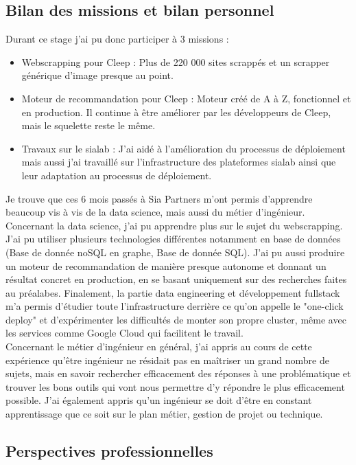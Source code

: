 \documentclass{article} %
\begin{document}
\subsection{Bilan des missions et bilan personnel}
Durant ce stage j'ai pu donc participer à 3 missions :
\begin{itemize}
	\item Webscrapping pour Cleep : Plus de 220 000 sites scrappés et un scrapper générique d'image presque au point.
	\item Moteur de recommandation pour Cleep : Moteur créé de A à Z, fonctionnel et en production. Il continue à être améliorer par les développeurs de Cleep, mais le squelette reste le même. 
	\item Travaux sur le sialab : J'ai aidé à l'amélioration du processus de déploiement mais aussi j'ai travaillé sur l'infrastructure des plateformes sialab ainsi que leur adaptation au processus de déploiement.
\end{itemize}

Je trouve que ces 6 mois passés à Sia Partners m'ont permis d'apprendre beaucoup vis à vis de la data science, mais aussi du métier d'ingénieur. Concernant la data science, j'ai pu apprendre plus sur le sujet du webscrapping. J'ai pu utiliser plusieurs technologies différentes notamment en base de données (Base de donnée noSQL en graphe, Base de donnée SQL). J'ai pu aussi produire un moteur de recommandation de manière presque autonome et donnant un résultat concret en production, en se basant uniquement sur des recherches faites au préalabes. Finalement, la partie data engineering et développement  fullstack m'a permis d'étudier toute l'infrastructure derrière ce qu'on appelle le "one-click deploy" et d'expérimenter les difficultés de monter son propre cluster, même avec les services comme Google Cloud qui facilitent le travail.\\

Concernant le métier d’ingénieur en général, j’ai appris au cours de cette
expérience qu’être ingénieur ne résidait pas en maîtriser un grand nombre de sujets,
mais en savoir rechercher efficacement des réponses à une problématique et trouver
les bons outils qui vont nous permettre d’y répondre le plus efficacement possible. J’ai
également appris qu’un ingénieur se doit d’être en constant apprentissage que ce
soit sur le plan métier, gestion de projet ou technique.

\subsection{Perspectives professionnelles}
\end{document}
